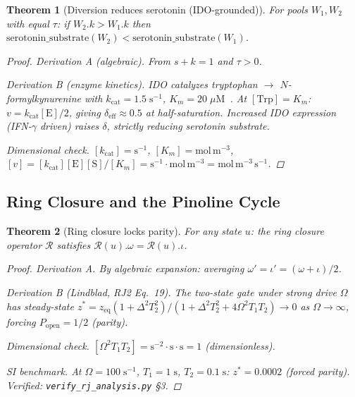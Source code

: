 \documentclass[12pt,oneside]{article}
\theoremstyle{principia}
\newtheorem{theorem}{Theorem}[section]
\theoremstyle{definition}
\theoremstyle{remark}
\begin{document}
\begin{theorem}[Diversion reduces serotonin (IDO-grounded)]
\label{thm:diversion}
For pools $W_1, W_2$ with equal $\tau$: if $W_2.k > W_1.k$ then
$\mathrm{serotonin\_substrate}(W_2) < \mathrm{serotonin\_substrate}(W_1)$.

\begin{proof}
\emph{Derivation A (algebraic).} From $s + k = 1$ and $\tau > 0$.

\emph{Derivation B (enzyme kinetics).}
IDO catalyzes tryptophan $\to$ $N$-formylkynurenine with
$k_\mathrm{cat} = 1.5\;\mathrm{s^{-1}}$,
$K_m = 20\;\mu\mathrm{M}$~\cite{sono96}.
At $[\mathrm{Trp}] = K_m$: $v = k_\mathrm{cat}[\mathrm{E}]/2$,
giving $\delta_\mathrm{eff} \approx 0.5$ at half-saturation.
Increased IDO expression (IFN-$\gamma$ driven) raises $\delta$,
strictly reducing serotonin substrate.

\emph{Dimensional check.}
$[k_\mathrm{cat}] = \mathrm{s^{-1}}$, $[K_m] = \mathrm{mol\,m^{-3}}$,
$[v] = [k_\mathrm{cat}][\mathrm{E}][\mathrm{S}]/[K_m] = \mathrm{s^{-1}\cdot mol\,m^{-3}} = \mathrm{mol\,m^{-3}\,s^{-1}}$. \checkmark
\qedhere
\end{proof}
\end{theorem}

\subsection{Ring Closure and the Pinoline Cycle}

\begin{theorem}[Ring closure locks parity]
For any state $u$: the ring closure operator $\mathcal{R}$ satisfies
$\mathcal{R}(u).\omega = \mathcal{R}(u).\iota$.

\begin{proof}
\emph{Derivation A.} By algebraic expansion: averaging $\omega' = \iota' = (\omega+\iota)/2$.

\emph{Derivation B (Lindblad, RJ2 Eq.~19).}
The two-state gate under strong drive $\Omega$ has steady-state
$z^* = z_\mathrm{eq}(1+\Delta^2T_2^2)/(1+\Delta^2T_2^2+4\Omega^2T_1T_2) \to 0$
as $\Omega\to\infty$, forcing $P_\mathrm{open} = 1/2$ (parity).

\emph{Dimensional check.}
$[\Omega^2 T_1 T_2] = \mathrm{s^{-2}\cdot s\cdot s} = 1$ (dimensionless). \checkmark

\emph{SI benchmark.}
At $\Omega = 100\;\mathrm{s^{-1}}$, $T_1 = 1\;\mathrm{s}$, $T_2 = 0.1\;\mathrm{s}$:
$z^* = 0.0002$ (forced parity). Verified: \texttt{verify\_rj\_analysis.py} \S3.
\qedhere
\end{proof}
\end{theorem}
\end{document}
